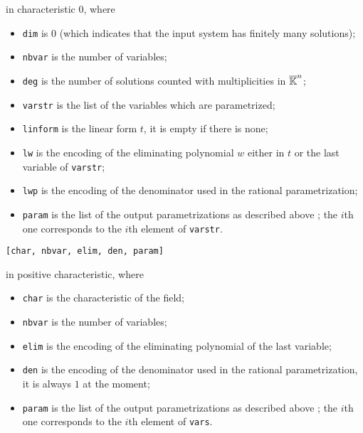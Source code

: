 \documentclass[a4paper,english,11pt]{scrartcl}
\theoremstyle{definition}
\theoremstyle{remark}
\begin{document}
in characteristic $0$, where
\begin{itemize}
\item \texttt{dim} is $0$ (which indicates that the input system has finitely
  many solutions);
\item \texttt{nbvar} is the number of variables;
\item \texttt{deg} is the number of solutions counted with multiplicities in
  $\overline{\mathbb{K}}^n$;
\item \texttt{varstr} is the list of the variables which are parametrized;
\item \texttt{linform} is the linear form $t$, it is empty if there is none;
\item \texttt{lw} is the encoding of the eliminating polynomial $w$
  either in $t$ or the last variable of \texttt{varstr};
\item \texttt{lwp} is the encoding of the denominator used in the rational
  parametrization;
\item \texttt{param} is the list of the output parametrizations as described
  above ; the $i$th one corresponds to the $i$th element of \texttt{varstr}.
\end{itemize}
\begin{verbatim}
[char, nbvar, elim, den, param]
\end{verbatim}
in positive characteristic, where
\begin{itemize}
\item \texttt{char} is the characteristic of the field;
\item \texttt{nbvar} is the number of variables;
\item \texttt{elim} is the encoding of the eliminating polynomial of
  the last variable;
\item \texttt{den} is the encoding of the denominator used in the rational
  parametrization, it is always $1$ at the moment;
\item \texttt{param} is the list of the output parametrizations as described
  above ; the $i$th one corresponds to the $i$th element of \texttt{vars}.
\end{itemize}
\end{document}
